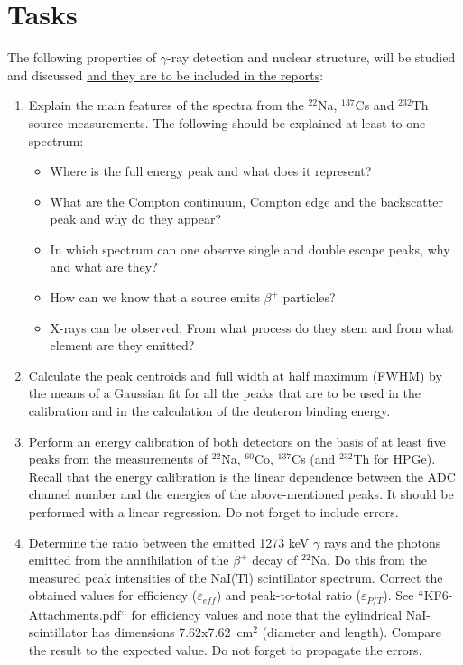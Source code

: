 \documentclass[12pt]{article}
\begin{document}
\section*{Tasks}
The following properties of $\gamma$-ray detection and nuclear structure, will be studied and discussed \underline{and they are to be included in the reports}:
\begin{enumerate}
  \item Explain the main features of the spectra from the $^{22}$Na, $^{137}$Cs and $^{232}$Th source measurements. The following should be explained at least to one spectrum:
    \begin{itemize}
      \item Where is the full energy peak and what does it represent?
      \item What are the Compton continuum, Compton edge and the backscatter peak and why do they appear?
      \item In which spectrum can one observe single and double escape peaks, why and what are they?
      \item How can we know that a source emits $\beta^{+}$ particles?
      \item X-rays can be observed. From what process do they stem and from what element are they emitted?
    \end{itemize}
  \item Calculate the peak centroids and full width at half maximum (FWHM) by the means of a Gaussian fit for all the peaks that are to be used in the calibration and in the calculation of the deuteron binding energy.
  \item Perform an energy calibration of both detectors on the basis of at least five peaks from the measurements of $^{22}$Na, $^{60}$Co, $^{137}$Cs (and $^{232}$Th for HPGe). Recall that the energy calibration is the linear dependence between the ADC channel number and the energies of the above-mentioned peaks. It should be performed with a linear regression. Do not forget to include errors.
  \item Determine the ratio between the emitted 1273 keV $\gamma$ rays and the photons emitted from the annihilation of the $\beta^+$ decay of $^{22}$Na. Do this from the measured peak intensities of the NaI(Tl) scintillator spectrum. Correct the obtained values for efficiency ($\varepsilon_{eff}$) and peak-to-total ratio ($\varepsilon_{P/T}$). See ``KF6-Attachments.pdf`` for efficiency values and note that the cylindrical NaI-scintillator has dimensions 7.62x7.62~cm$^2$ (diameter and length). Compare the result to the expected value. Do not forget to propagate the errors.

\end{enumerate}
\end{document}
